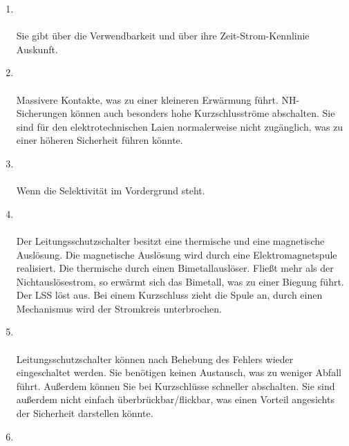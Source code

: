\begin{enumerate}
    \item   {} \\\\
            Sie gibt über die Verwendbarkeit und über ihre Zeit-Strom-Kennlinie Auskunft.
    \item   {} \\\\
            Massivere Kontakte, was zu einer kleineren Erwärmung führt. NH-Sicherungen können auch besonders hohe Kurzschlusströme abschalten.
            Sie sind für den elektrotechnischen Laien normalerweise nicht zugänglich, was zu einer höheren Sicherheit führen könnte.

    \item   {} \\\\
            Wenn die Selektivität im Vordergrund steht. 
    \item   {} \\\\
            Der Leitungsschutzschalter besitzt eine thermische und eine magnetische Auslösung. Die magnetische Auslösung wird durch eine Elektromagnetspule realisiert. Die thermische 
            durch einen Bimetallauslöser. Fließt mehr als der Nichtauslösestrom, so erwärmt sich das Bimetall, was zu einer Biegung führt. Der LSS löst aus. Bei einem Kurzschluss zieht die Spule an, durch einen 
            Mechanismus wird der Stromkreis unterbrochen.
    \item   {}\\\\
            Leitungsschutzschalter können nach Behebung des Fehlers wieder eingeschaltet werden. Sie benötigen keinen Austausch, was zu weniger 
            Abfall führt. Außerdem können Sie bei Kurzschlüsse schneller abschalten. Sie sind außerdem nicht einfach überbrückbar/flickbar, was einen Vorteil angesichts der Sicherheit 
            darstellen könnte.
    \item   {} \\\\

\end{enumerate}
